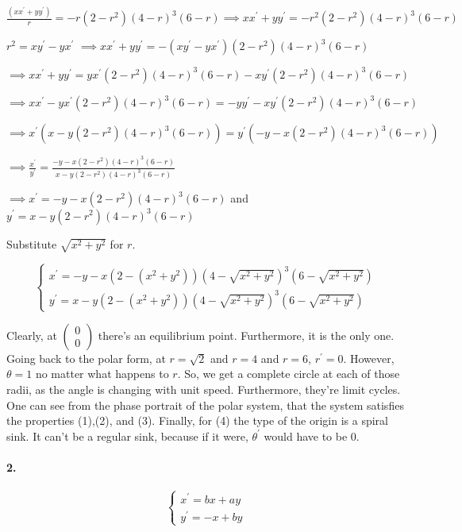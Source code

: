 \documentclass{article}
\begin{document}
$\frac{(xx^\prime+yy^\prime)}{r} = -r(2-r^2)
(4-r)^3(6-r) \implies xx^\prime+yy^\prime = -r^2(2-r^2)
(4-r)^3(6-r)$

$r^2 = xy^\prime -yx^\prime$ $\implies xx^\prime+yy^\prime = -(xy^\prime -yx^\prime)(2-r^2)
(4-r)^3(6-r)$

$\implies xx^\prime+yy^\prime = yx^\prime(2-r^2)
(4-r)^3(6-r) -xy^\prime(2-r^2)
(4-r)^3(6-r)$

$\implies xx^\prime - yx^\prime(2-r^2)
(4-r)^3(6-r)= -yy^\prime -xy^\prime(2-r^2)
(4-r)^3(6-r)$

$\implies x^\prime(x - y(2-r^2)
(4-r)^3(6-r))= y^\prime(-y -x(2-r^2)
(4-r)^3(6-r))$

$\implies \frac{x^\prime }{y^\prime} =\frac{-y -x(2-r^2)
(4-r)^3(6-r)}{x - y(2-r^2)
(4-r)^3(6-r)}$


$\implies x^\prime =-y -x(2-r^2)
(4-r)^3(6-r)$
and
$ y^\prime = x - y(2-r^2)
(4-r)^3(6-r)$

Substitute $\sqrt{x^2+y^2}$ for $r$.

\[\begin{cases}
    x^\prime = -y -x(2-(x^2+y^2))
    (4-\sqrt{x^2+y^2})^3(6-\sqrt{x^2+y^2})\\
    y^\prime = x - y(2-(x^2+y^2))
    (4-\sqrt{x^2+y^2})^3(6-\sqrt{x^2+y^2})\end{cases}\]

Clearly, at $\begin{pmatrix} 0\\ 0 \end{pmatrix}$ there's an
equilibrium point. Furthermore, it is the only one. Going back to the
polar form, at $r=\sqrt{2}$ and $r=4$ and $r= 6$, $r^\prime =
0$. However, $\theta = 1$ no matter what happens to $r$. So, we get a
complete circle at each of those radii, as the angle is changing with
unit speed. Furthermore, they're limit cycles. One can see from the
phase portrait of the polar system, that the system satisfies the
properties (1),(2), and (3). Finally, for (4) the type of the origin is a
spiral sink. It can't be a regular sink, because if it were, $\theta^\prime$
would have to be $0$.

\paragraph{2.}

\[\begin{cases}
    x^\prime = bx + ay \\
    y^\prime = -x +by
\end{cases}\]
\end{document}
